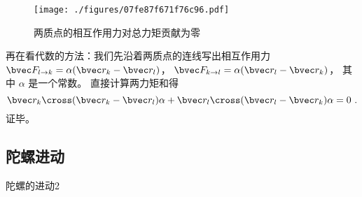\begin{figure}[ht]
\centering
\texttt{[image: ./figures/07fe87f671f76c96.pdf]}
\caption{两质点的相互作用力对总力矩贡献为零}\label{fig_AMLaw_1}
\end{figure}

再在看代数的方法：我们先沿着两质点的连线写出相互作用力 $\bvec F_{l\to k} = \alpha(\bvec r_k - \bvec r_l)$， $\bvec F_{k\to l} = \alpha(\bvec r_l - \bvec r_k)$， 其中 $\alpha$ 是一个常数。 直接计算两力矩和得
\begin{equation}
\bvec r_k \cross (\bvec r_k - \bvec r_l)\alpha + \bvec r_l \cross (\bvec r_l - \bvec r_k)\alpha = 0~.
\end{equation}
证毕。

\subsection{陀螺进动}
\begin{example}{陀螺的进动2}\label{ex_AMLaw_3}
\end{example}
